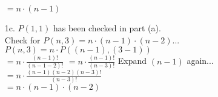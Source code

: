 \begin{enumerate}
                        $ = n \cdot (n-1)$ \checkmark 
                        
        \item[1c.]      $P(1,1)$ has been checked in part (a). \\

                        Check for $P(n,3) = n \cdot (n-1) \cdot (n-2)$... \\
                        $P(n,3) = n \cdot P( (n-1), (3-1) )$ \\
                        $ = n \cdot \frac{ (n-1)! }{ (n-1-2)! } $ \tab
                        $ = n \cdot \frac{ (n-1)! }{ (n-3)! } $ \tab Expand $(n-1)$ again... \\
                        $ = n \cdot \frac{ (n-1)(n-2)(n-3)! }{ (n-3)! } $ \\
                        $ = n \cdot (n-1) \cdot (n-2) $ \checkmark
    \end{enumerate}



